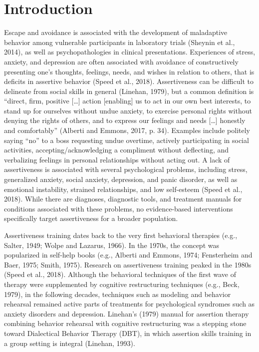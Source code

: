 \documentclass[3p]{elsarticle} %
\begin{document}
\hypertarget{introduction}{%
\section{Introduction}\label{introduction}}

Escape and avoidance is associated with the development of maladaptive
behavior among vulnerable participants in laboratory trials (Sheynin et
al., 2014), as well as psychopathologies in clinical presentations.
Experiences of stress, anxiety, and depression are often associated with
avoidance of constructively presenting one's thoughts, feelings, needs,
and wishes in relation to others, that is deficits in assertive behavior
(Speed et al., 2018). Assertiveness can be difficult to delineate from
social skills in general (Linehan, 1979), but a common definition is
``direct, firm, positive {[}\ldots{]} action {[}enabling{]} us to act in
our own best interests, to stand up for ourselves without undue anxiety,
to exercise personal rights without denying the rights of others, and to
express our feelings and needs {[}\ldots{]} honestly and comfortably''
(Alberti and Emmons, 2017, p. 34). Examples include politely saying
``no'' to a boss requesting undue overtime, actively participating in
social activities, accepting/acknowledging a compliment without
deflecting, and verbalizing feelings in personal relationships without
acting out. A lack of assertiveness is associated with several
psychological problems, including stress, generalized anxiety, social
anxiety, depression, and panic disorder, as well as emotional
instability, strained relationships, and low self-esteem (Speed et al.,
2018). While there are diagnoses, diagnostic tools, and treatment
manuals for conditions associated with these problems, no evidence-based
interventions specifically target assertiveness for a broader
population.

Assertiveness training dates back to the very first behavioral therapies
(e.g., Salter, 1949; Wolpe and Lazarus, 1966). In the 1970s, the concept
was popularized in self-help books (e.g., Alberti and Emmons, 1974;
Fensterheim and Baer, 1975; Smith, 1975). Research on assertiveness
training peaked in the 1980s (Speed et al., 2018). Although the
behavioral techniques of the first wave of therapy were supplemented by
cognitive restructuring techniques (e.g., Beck, 1979), in the following
decades, techniques such as modeling and behavior rehearsal remained
active parts of treatments for psychological syndromes such as anxiety
disorders and depression. Linehan's (1979) manual for assertion therapy
combining behavior rehearsal with cognitive restructuring was a stepping
stone toward Dialectical Behavior Therapy (DBT), in which assertion
skills training in a group setting is integral (Linehan, 1993).
\end{document}

